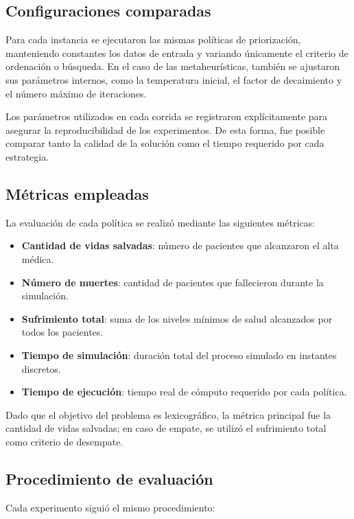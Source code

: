 \documentclass[12pt,a4paper]{article}
\begin{document}
\subsection{Configuraciones comparadas}

Para cada instancia se ejecutaron las mismas políticas de priorización, manteniendo constantes los datos de entrada y 
variando únicamente el criterio de ordenación o búsqueda. 
En el caso de las metaheurísticas, también se ajustaron sus parámetros internos, como la temperatura inicial, 
el factor de decaimiento y el número máximo de iteraciones.

Los parámetros utilizados en cada corrida se registraron explícitamente para asegurar la reproducibilidad de los experimentos. 
De esta forma, fue posible comparar tanto la calidad de la solución como el tiempo requerido por cada estrategia.

\subsection{Métricas empleadas}

La evaluación de cada política se realizó mediante las siguientes métricas:

\begin{itemize}
    \item \textbf{Cantidad de vidas salvadas}: número de pacientes que alcanzaron el alta médica.
    \item \textbf{Número de muertes}: cantidad de pacientes que fallecieron durante la simulación.
    \item \textbf{Sufrimiento total}: suma de los niveles mínimos de salud alcanzados por todos los pacientes.
    \item \textbf{Tiempo de simulación}: duración total del proceso simulado en instantes discretos.
    \item \textbf{Tiempo de ejecución}: tiempo real de cómputo requerido por cada política.
\end{itemize}

Dado que el objetivo del problema es lexicográfico, la métrica principal fue la cantidad de vidas salvadas; 
en caso de empate, se utilizó el sufrimiento total como criterio de desempate.

\subsection{Procedimiento de evaluación}

Cada experimento siguió el mismo procedimiento:
\end{document}
